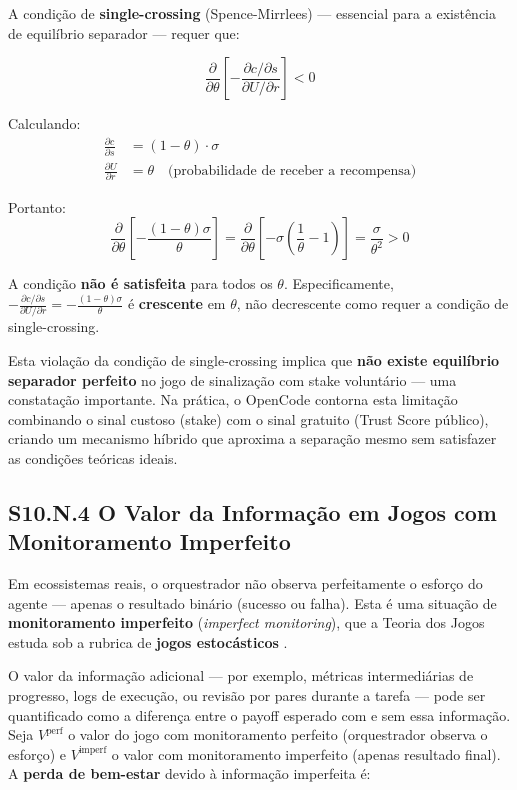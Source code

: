 A condição de \textbf{single-crossing} (Spence-Mirrlees) --- essencial para a existência de equilíbrio separador --- requer que:

\begin{equation}\label{eq:single_crossing_formal}
\frac{\partial}{\partial \theta}\left[-\frac{\partial c / \partial s}{\partial U / \partial r}\right] < 0
\end{equation}

Calculando:
\begin{align}
\frac{\partial c}{\partial s} &= (1 - \theta) \cdot \sigma \\
\frac{\partial U}{\partial r} &= \theta \quad \text{(probabilidade de receber a recompensa)}
\end{align}

Portanto:
\begin{equation}
\frac{\partial}{\partial \theta}\left[-\frac{(1 - \theta)\sigma}{\theta}\right] = \frac{\partial}{\partial \theta}\left[-\sigma\left(\frac{1}{\theta} - 1\right)\right] = \frac{\sigma}{\theta^2} > 0
\end{equation}

A condição \textbf{não é satisfeita} para todos os $\theta$. Especificamente, $-\frac{\partial c / \partial s}{\partial U / \partial r} = -\frac{(1-\theta)\sigma}{\theta}$ é \textbf{crescente} em $\theta$, não decrescente como requer a condição de single-crossing.

Esta violação da condição de single-crossing implica que \textbf{não existe equilíbrio separador perfeito} no jogo de sinalização com stake voluntário --- uma constatação importante. Na prática, o OpenCode contorna esta limitação combinando o sinal custoso (stake) com o sinal gratuito (Trust Score público), criando um mecanismo híbrido que aproxima a separação mesmo sem satisfazer as condições teóricas ideais.

\subsection*{S10.N.4 O Valor da Informação em Jogos com Monitoramento Imperfeito}

Em ecossistemas reais, o orquestrador não observa perfeitamente o esforço do agente --- apenas o resultado binário (sucesso ou falha). Esta é uma situação de \textbf{monitoramento imperfeito} (\textit{imperfect monitoring}), que a Teoria dos Jogos estuda sob a rubrica de \textbf{jogos estocásticos} \cite{kandori2008repeated}.

O valor da informação adicional --- por exemplo, métricas intermediárias de progresso, logs de execução, ou revisão por pares durante a tarefa --- pode ser quantificado como a diferença entre o payoff esperado com e sem essa informação. Seja $V^{\text{perf}}$ o valor do jogo com monitoramento perfeito (orquestrador observa o esforço) e $V^{\text{imperf}}$ o valor com monitoramento imperfeito (apenas resultado final). A \textbf{perda de bem-estar} devido à informação imperfeita é:

